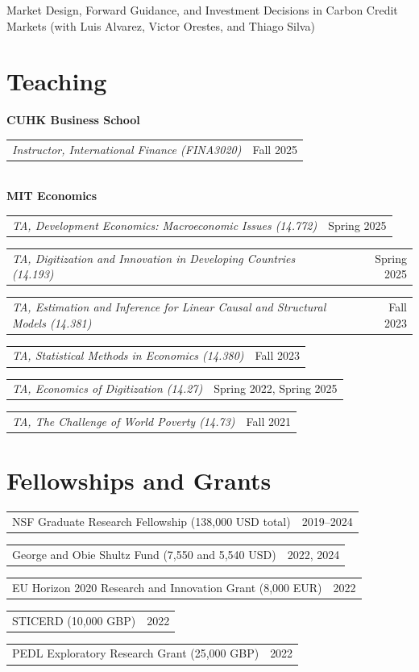 \documentclass[12pt, a4paper]{article}
\makeatletter
\newcommand{\teachingentry}[2]{%
  \noindent
  \begin{tabular*}{\textwidth}{@{\extracolsep{\fill}} l r}
    \emph{#1} & { #2} \\
  \end{tabular*}
  \vspace{0.05em}%
}
\newcommand{\regentry}[2]{%
  \noindent
  \begin{tabular*}{\textwidth}{@{\extracolsep{\fill}} p{0.8\textwidth} r}
    #1 & { #2} \\
  \end{tabular*}%
  \vspace{0.3em}%
}
\makeatother
\begin{document}
Market Design, Forward Guidance, and Investment Decisions in Carbon Credit Markets (with Luis Alvarez, Victor Orestes, and Thiago Silva) \\


\vspace{-5mm}
\section*{Teaching}
\textbf{CUHK Business School} \\
\teachingentry{Instructor, International Finance (FINA3020)}{Fall 2025}  \\[0.2em]
\textbf{MIT Economics} \\
\teachingentry{TA, Development Economics: Macroeconomic Issues (14.772)}{Spring 2025}
\teachingentry{TA, Digitization and Innovation in Developing Countries (14.193)}{Spring 2025}
\teachingentry{TA, Estimation and Inference for Linear Causal and Structural Models (14.381)}{Fall 2023}
\teachingentry{TA, Statistical Methods in Economics (14.380)}{Fall 2023}
\teachingentry{TA, Economics of Digitization (14.27)}{Spring 2022, Spring 2025}
\teachingentry{TA, The Challenge of World Poverty (14.73)}{Fall 2021}

\vspace{-5mm}
\section*{Fellowships and Grants}
\regentry{NSF Graduate Research Fellowship (138,000 USD total)}{2019–2024}
\regentry{George and Obie Shultz Fund (7,550 and 5,540 USD)}{2022, 2024}
\regentry{EU Horizon 2020 Research and Innovation Grant  (8,000 EUR)}{2022}
\regentry{STICERD (10,000 GBP)}{2022}
\regentry{PEDL Exploratory Research Grant (25,000 GBP)}{2022}
\end{document}

